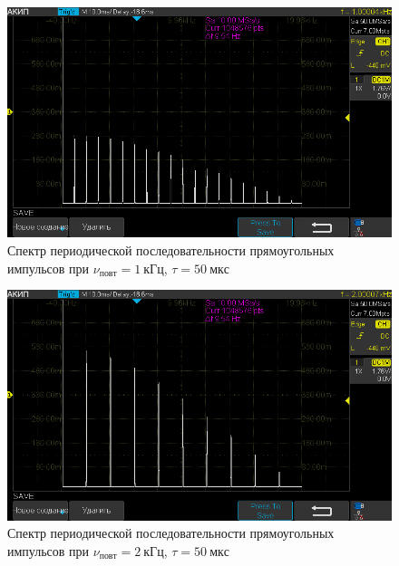 \documentclass[a4paper, 12pt]{article}
\begin{document}
\begin{figure}[h!]
\begin{flushleft}
    \includegraphics[scale=0.5]{AKIP0001.png}
\end{flushleft}
\caption{Спектр периодической последовательности прямоугольных импульсов при \newline $\nu_{повт} = 1~кГц$, $\tau = 50~мкс$}
\label{ris7}
\end{figure}

\begin{figure}[h!]
\begin{flushleft}
    \includegraphics[scale=0.5]{AKIP0002.png}
\end{flushleft}
\caption{Спектр периодической последовательности прямоугольных импульсов при \newline $\nu_{повт} = 2~кГц$, $\tau = 50~мкс$}
\label{ris8}
\end{figure}
\end{document}
